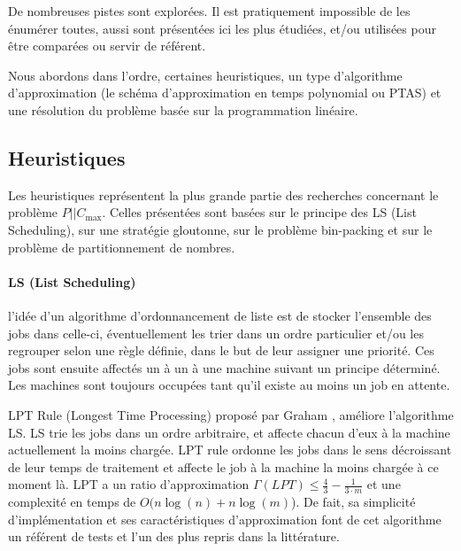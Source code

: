 \documentclass[a4paper,12pt]{report}
\theoremstyle{plain}				%
\theoremstyle{definition}				%
\newcommand\problemGrahamP{$P||C_{\max}$\xspace}
\begin{document}
De nombreuses pistes sont explorées. Il est pratiquement impossible de les énumérer toutes, 
  aussi sont présentées ici les plus étudiées, 
  et/ou utilisées pour être comparées ou servir de référent.
  
Nous abordons dans l'ordre, certaines heuristiques, un type d'algorithme d'approximation (le schéma d'approximation en temps polynomial ou PTAS) et une résolution du problème basée sur la programmation linéaire.

\subsection{Heuristiques}\label{ssec:Heuristiques}

Les heuristiques représentent la plus grande partie des recherches concernant le problème \problemGrahamP. 
Celles présentées sont basées 
  sur le principe des LS (List Scheduling), 
  sur une stratégie gloutonne,   
  sur le problème bin-packing et  
  sur le problème de partitionnement de nombres. 

\bigskip   
\paragraph{LS (List Scheduling)}
l'idée d'un algorithme d'ordonnancement de liste est de stocker l'ensemble des jobs dans celle-ci, éventuellement les trier dans un ordre particulier et/ou les regrouper selon une règle définie, dans le but de leur assigner une priorité. Ces jobs sont ensuite affectés un à un à une machine suivant un principe déterminé. 
Les machines sont toujours occupées tant qu'il existe au moins un job en attente.


LPT Rule (Longest Time Processing) %
  proposé par Graham \cite{graham1966bounds}, 
  améliore l'algorithme LS. LS trie les jobs dans un ordre arbitraire, 
  et affecte chacun d'eux à la machine actuellement la moins chargée. 
  LPT rule ordonne les jobs dans le sens décroissant de leur temps de traitement et affecte le job à la machine la moins chargée à ce moment là. 
LPT a 
  un ratio d'approximation $\Gamma(LPT) \leq \frac{4}{3}-\frac{1}{3 \cdot m}$ et 
  une complexité en temps de $ O(n \log(n) + n \log(m)$).
De fait, sa simplicité d'implémentation et ses caractéristiques d'approximation font 
  de cet algorithme un référent de tests et l'un des plus repris dans la littérature.
  
\end{document}
